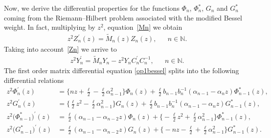 \documentclass[12pt]{amsart}
\newtheorem{theorem}{Theorem}[section]
\newtheorem{corollary}{Corollary}[section]
\newcommand{\dde}{\operatorname e}
\begin{document}
Now, we derive the differential properties for the functions \( \Phi_n \), \( \Phi_n^* \), \( G_n \) and \( G_n^* \) coming from the Riemann--Hilbert problem associated with the modified Bessel weight.
In fact, multiplying by \( z^2 \), equation~\eqref{Mn} we obtain
\begin{align*}
z^2 Z_n^\prime(z) = \widetilde M_n (z) Z_n (z), && n \in \mathbb N .
\end{align*}
Taking into account~\eqref{Zn} we arrive to
\begin{align}\label{op1bessel}
 z^2Y_n^\prime 
 =
\widetilde{M}_nY_n-z^2Y_nC_n^\prime C_n^{-1} , && n \in \mathbb N . 
\end{align}
The first order matrix differential equation \eqref{op1bessel} splits into the following differential relations 
\begin{align}
 z^2\Phi_n^\prime (z) & =\bigg\{nz+\frac{ \ell }{2}-\frac{ \ell }{2}\alpha_{n-1}^2\bigg\}\Phi_n(z)+\frac{ \ell }{2}b_{n-1}b_n^{-1} ( \alpha_{n-1}-\alpha_n z ) \Phi_{n-1}^*(z)
 \label{eqdiferbessel}
 ,
 \\
 \nonumber z^2G_n^\prime (z) & =\bigg\{\frac{ \ell }{2}z^2-\frac{ \ell }{2}\alpha_{n-1}^2\bigg\}G_n(z)+\frac{ \ell }{2}b_{n-1}b_n^{-1} ( \alpha_{n-1}-\alpha_n z ) G_{n-1}^*(z)
 ,
 \\
\nonumber z^2 \big( \Phi_{n-1}^* \big)^\prime (z) & 
 =\frac{ \ell }{2} ( \alpha_{n-1}-\alpha_{n-2}z ) \Phi_n(z)+\bigg\{-\frac{ \ell }{2}z^2+\frac{ \ell }{2}\alpha_{n-1}^2\bigg\} \Phi_{n-1}^*(z)
 ,
 \\
\nonumber z^2 \big( G_{n-1}^* \big) ^\prime (z) & 
 =\frac{ \ell }{2} ( \alpha_{n-1}-\alpha_{n-2}z ) G_n(z)+\bigg\{-nz-\frac{ \ell }{2}+\frac{ \ell }{2}\alpha_{n-1}^2\bigg\}G_{n-1}^*(z)
 .
 \end{align} 
\end{document}
